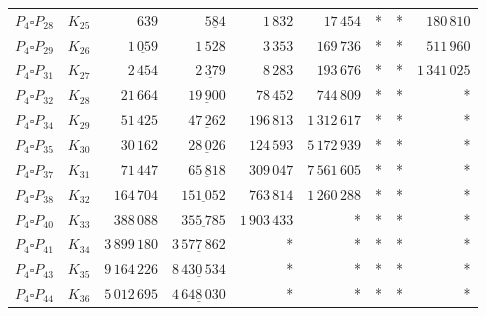 \begin{tabular}{ccrrrrrrr}
$P_4\square P_{28}$ & $K_{25}$ & $639$ & $\underline{584}$ & $1\,832$ & $17\,454$ & * & * & $180\,810$\\
$P_4\square P_{29}$ & $K_{26}$ & $\underline{1\,059}$ & $1\,528$ & $3\,353$ & $169\,736$ & * & * & $511\,960$\\
$P_4\square P_{31}$ & $K_{27}$ & $2\,454$ & $\underline{2\,379}$ & $8\,283$ & $193\,676$ & * & * & $1\,341\,025$\\
$P_4\square P_{32}$ & $K_{28}$ & $21\,664$ & $\underline{19\,900}$ & $78\,452$ & $744\,809$ & * & * & *\\
$P_4\square P_{34}$ & $K_{29}$ & $51\,425$ & $\underline{47\,262}$ & $196\,813$ & $1\,312\,617$ & * & * & *\\
$P_4\square P_{35}$ & $K_{30}$ & $30\,162$ & $\underline{28\,026}$ & $124\,593$ & $5\,172\,939$ & * & * & *\\
$P_4\square P_{37}$ & $K_{31}$ & $71\,447$ & $\underline{65\,818}$ & $309\,047$ & $7\,561\,605$ & * & * & *\\
$P_4\square P_{38}$ & $K_{32}$ & $164\,704$ & $\underline{151\,052}$ & $763\,814$ & $1\,260\,288$ & * & * & *\\
$P_4\square P_{40}$ & $K_{33}$ & $388\,088$ & $\underline{355\,785}$ & $1\,903\,433$ & * & * & * & *\\
$P_4\square P_{41}$ & $K_{34}$ & $3\,899\,180$ & $\underline{3\,577\,862}$ & * & * & * & * & *\\
$P_4\square P_{43}$ & $K_{35}$ & $9\,164\,226$ & $\underline{8\,430\,534}$ & * & * & * & * & *\\
$P_4\square P_{44}$ & $K_{36}$ & $5\,012\,695$ & $\underline{4\,648\,030}$ & * & * & * & * & *\\

    \bottomrule
\end{tabular}

